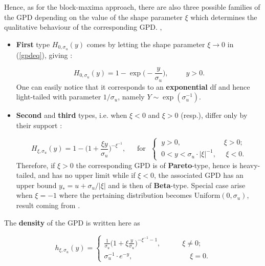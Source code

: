 Hence, as for the block-maxima approach, there are also three possible families of the GPD depending on the value of the shape parameter $\xi$ which determines the qualitative behaviour of the corresponding GPD. \cite{hosking_parameter_1987}, \cite{singh_parameter_1995}

\begin{itemize}
	\item \textbf{First} type $H_{0,\sigma_u}(y)$ comes by letting the shape parameter $\xi\rightarrow 0$ in (\ref{gpdeq}), giving :
	
	\begin{equation}\label{gpd0}
	H_{0,\sigma_u}(y)=1-\exp
	\Big(-\frac{y}{\sigma_u}\Big), \ \ \ \ \ \ \ \ \ \ \ y>0.
	\end{equation}
	One can easily notice that it corresponds to an \textbf{exponential} df and hence light-tailed with parameter $1/ \sigma_u$, namely 
	$Y\sim\exp(\sigma_u^{-1})$.
	
	\item \textbf{Second} and \textbf{third} types, i.e. when $\xi<0$ and $\xi>0$ (resp.), differ only by their support : 
	
	\begin{equation}\label{gpdm}
	H_{\xi,\sigma_u}(y)=1-\bigg(1+\frac{\xi y}{\sigma_u}\bigg)^{-\xi^{-1}}, \ \ \ \ \  \ \ \text{for} \ \ \ \begin{cases}
	\ y>0,  \ \ \ \ \ \ \ \ \ \ \ \ \ \ \  \ \ \qquad \ \xi>0; \\
	\  0<y<\sigma_u\cdot|\xi|^{-1}, \ \ \ \  \  \  \xi<0.
	\end{cases}
	\end{equation}
	Therefore, if $\xi>0$ the corresponding GPD is of \textbf{Pareto}-type, hence is heavy-tailed, and has no upper limit while if $\xi<0$, the associated GPD has an upper bound $y_*=u+\sigma_u/|\xi|$ and is then of \textbf{Beta}-type. Special case arise when $\xi=-1$ where the pertaining distribution becomes Uniform$(0,\sigma_u)$, result coming from \citet[pp.186]{grimshaw_computing_1993}.
	
	
\end{itemize}
The \textbf{density} of the GPD is written here as

\begin{equation}\label{densgpd}
h_{\xi,\sigma_u}(y)=\begin{cases}
\frac{1}{\sigma_u}\bigg(1+\xi\frac{y}{\sigma_u}\bigg)^{-\xi^{-1}-1}, \qquad\quad \xi\neq 0; \\
\sigma_u^{-1}\cdot e^{-y},\qquad\qquad\qquad\qquad \xi= 0.
\end{cases}
\end{equation}


